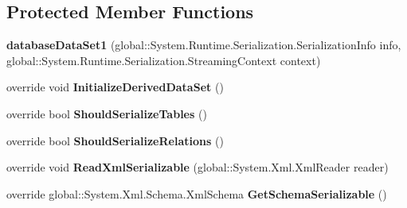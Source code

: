 \subsection*{Protected Member Functions}
\begin{DoxyCompactItemize}
\item 
\mbox{\label{classprojekt__grupowy_1_1database_data_set1_a23b543373c1ac8f70dae82cb92a3cbbf}} 
{\bfseries database\+Data\+Set1} (global\+::\+System.\+Runtime.\+Serialization.\+Serialization\+Info info, global\+::\+System.\+Runtime.\+Serialization.\+Streaming\+Context context)
\item 
\mbox{\label{classprojekt__grupowy_1_1database_data_set1_abe6ee517fcdcf64c615aaf27c41b3765}} 
override void {\bfseries Initialize\+Derived\+Data\+Set} ()
\item 
\mbox{\label{classprojekt__grupowy_1_1database_data_set1_acf83edfed0f908344cc99922e3862e73}} 
override bool {\bfseries Should\+Serialize\+Tables} ()
\item 
\mbox{\label{classprojekt__grupowy_1_1database_data_set1_a1c99be96ad36bfb146f00c6a31410188}} 
override bool {\bfseries Should\+Serialize\+Relations} ()
\item 
\mbox{\label{classprojekt__grupowy_1_1database_data_set1_aee2606d23b133be281612ca5f31b7505}} 
override void {\bfseries Read\+Xml\+Serializable} (global\+::\+System.\+Xml.\+Xml\+Reader reader)
\item 
\mbox{\label{classprojekt__grupowy_1_1database_data_set1_a0a545d4d106212f1fd8a70a205d3ea72}} 
override global\+::\+System.\+Xml.\+Schema.\+Xml\+Schema {\bfseries Get\+Schema\+Serializable} ()
\end{DoxyCompactItemize}
